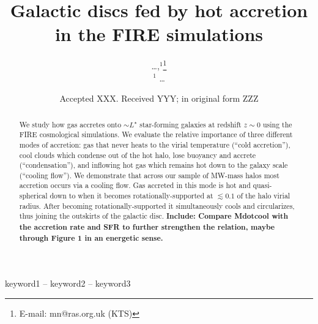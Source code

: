 \documentclass[fleqn,usenatbib]{mnras}
\title[Quiet Accretion in FIRE]{Galactic discs fed by hot accretion in the FIRE simulations}
\author[\ldots]{
\ldots,$^{1}$\thanks{E-mail: mn@ras.org.uk (KTS)}
\\
$^1$ \ldots
}
\date{Accepted XXX. Received YYY; in original form ZZZ}
\begin{document}
\label{firstpage}
\pagerange{\pageref{firstpage}--\pageref{lastpage}}
\maketitle

\begin{abstract}
We study how gas accretes onto $\sim L^\star$ star-forming galaxies at redshift $z\sim0$ using the FIRE cosmological simulations.
We evaluate the relative importance of three different modes of accretion: 
gas that never heats to the virial temperature (``cold accretion''), 
cool clouds which condense out of the hot halo, lose buoyancy and accrete  (``condensation''), 
and inflowing hot gas which remains hot down to the galaxy scale (``cooling flow'').
We demonstrate that across our sample of MW-mass halos most accretion occurs via a cooling flow.
Gas accreted in this mode is hot and quasi-spherical down to when it becomes rotationally-supported at $\lesssim 0.1$ of the halo virial radius.
After becoming rotationally-supported it simultaneously cools and circularizes, thus joining the outskirts of the galactic disc. 
\textbf{
Include: Compare Mdotcool with the accretion rate and SFR to further strengthen the relation, maybe through Figure 1 in an energetic sense.
}
\end{abstract}

\begin{keywords}
keyword1 -- keyword2 -- keyword3
\end{keywords}


\end{document}
